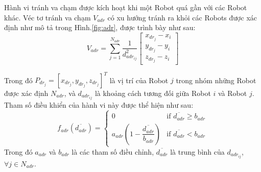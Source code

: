 Hành vi tránh va chạm được kích hoạt khi một Robot quá gần với các Robot khác. Véc tơ tránh va chạm $V_{adr}$ có xu hướng tránh ra khỏi các Robots được xác định như mô tả trong Hình.\ref{fig:adr}, được trình bày như sau:
\begin{equation}
    V_{adr}=\sum_{j=1}^{N_{adr}}\dfrac{1}{d_{adr_{ij}}^2}
    \left[\begin{array}{c}
    x_{dr_j}-x_i\\
    y_{dr_j}-y_i\\
    z_{dr_j}-z_i
    \end{array}\right]
\end{equation}

Trong đó $P_{dr_j}=\left[x_{dr_j},y_{dr_j}, z_{dr_j}\right]^T$ là vị trí của Robot $j$ trong nhóm những Robot được xác định $N_{adr}$, và $d_{adr_{ij}}$ là khoảng cách tương đối giữa Robot $i$ và Robot $j$. Tham số điều khiển của hành vi này được thể hiện như sau:
\begin{equation}
    f_{adr}\left(\overline{d_{adr}}\right)=\left\{ \begin{array}{cc}
    0 & \text{if } \overline{d_{adr}}\geq b_{adr}\\
    a_{adr}\left(1-\dfrac{\overline{d_{adr}}}{b_{adr}}\right) & \text{if } \overline{d_{adr}}<b_{adr}
    \end{array}\right.
\end{equation}
Trong đó $a_{adr}$ và $b_{adr}$ là các tham số điều chỉnh, $\overline{d_{adr}}$ là trung bình của $d_{adr_{ij}}$, $\forall j\in N_{adr}$.

